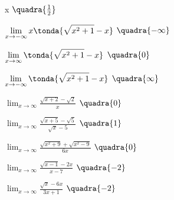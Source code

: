 \begin{esercizio}
\begin{multicols}{2}
\begin{enumeratea}
          x\)
  \hfill \(\quadra{\frac{1}{2}}\)
  \item \(\displaystyle \lim_{x \rightarrow -\infty} 
          x\tonda{\sqrt{x^2+1}-x}\)
  \hfill \(\quadra{-\infty}\)
  \item \(\displaystyle \lim_{x \rightarrow \infty} 
          \tonda{\sqrt{x^2+1}-x}\)
  \hfill \(\quadra{0}\)
  \item \(\displaystyle \lim_{x \rightarrow -\infty} 
          \tonda{\sqrt{x^2+1}-x}\)
  \hfill \(\quadra{\infty}\)
  \item \(\displaystyle \lim_{x \rightarrow \infty} 
          \frac{\sqrt{x+2}-\sqrt{2}}{x}\)
  \hfill \(\quadra{0}\)
  \item \(\displaystyle \lim_{x \rightarrow \infty} 
          \frac{\sqrt{x+5}-\sqrt{5}}{\sqrt{x}-5}\)
  \hfill \(\quadra{1}\)
  \item \(\displaystyle \lim_{x \rightarrow \infty} 
          \frac{\sqrt{x^2+9}+\sqrt{x^2-9}}{6x}\)
  \hfill \(\quadra{0}\)
  \item \(\displaystyle \lim_{x \rightarrow \infty} 
          \frac{\sqrt{x-1}-2x}{x-7}\)
  \hfill \(\quadra{-2}\)
  \item \(\displaystyle \lim_{x \rightarrow \infty} 
          \frac{\sqrt{x}-6x}{3x+1}\)
  \hfill \(\quadra{-2}\)
 \end{enumeratea}
 \end{multicols}
\end{esercizio}

\begin{comment}
\subsection{Esercizi riepilogativi}

\begin{esercizio}
\label{ese:D.19}
testo esercizio
\end{esercizio}

\begin{esercizio}\label{ese:03.1}
Consegna:
 \begin{enumeratea}
  \item  
 \end{enumeratea}
\end{esercizio}
\end{comment}
